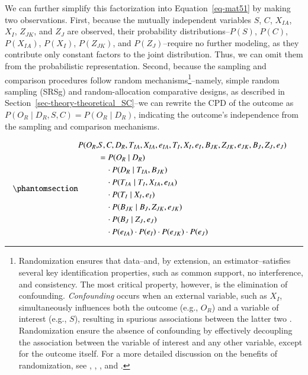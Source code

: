 \documentclass[
  authoryear,
  review,
  1p]{elsarticle}
\begin{document}
We can further simplify this factorization into Equation~\ref{eq-mat51}
by making two observations. First, because the mutually independent
variables \(S\), \(C\), \(X_{IA}\), \(X_{I}\), \(Z_{JK}\), and \(Z_{J}\)
are observed, their probability distributions--\(P(S)\), \(P(C)\),
\(P(X_{IA})\), \(P(X_{I})\), \(P(Z_{JK})\), and \(P(Z_{J})\)--require no
further modeling, as they contribute only constant factors to the joint
distribution. Thus, we can omit them from the probabilistic
representation. Second, because the sampling and comparison procedures
follow random mechanisms\footnote{Randomization ensures that data--and,
  by extension, an estimator--satisfies several key identification
  properties, such as common support, no interference, and consistency.
  The most critical property, however, is the elimination of
  confounding. \emph{Confounding} occurs when an external variable, such
  as \(X_{I}\), simultaneously influences both the outcome (e.g.,
  \(O_{R}\)) and a variable of interest (e.g., \(S\)), resulting in
  spurious associations between the latter two
  \citep{Everitt_et_al_2010}. Randomization ensure the absence of
  confounding by effectively decoupling the association between the
  variable of interest and any other variable, except for the outcome
  itself. For a more detailed discussion on the benefits of
  randomization, see \citet{Pearl_2009}, \citet{Morgan_et_al_2014},
  \citet{Neal_2020}, and \citet{Hernan_et_al_2025}.}--namely, simple
random sampling (SRSg) and random-allocation comparative designs, as
described in Section~\ref{sec-theory-theoretical_SC}--we can rewrite the
CPD of the outcome as
\(P(O_{R} \mid D_{R}, S, C) = P(O_{R} \mid D_{R})\), indicating the
outcome's independence from the sampling and comparison mechanisms.

\begin{equation}\protect\phantomsection\label{eq-mat51}{
\begin{aligned}
  P(O_{R}, & S, C, D_{R}, T_{IA}, X_{IA}, e_{IA}, T_{I}, X_{I}, e_{I}, B_{JK}, Z_{JK}, e_{JK}, B_{J}, Z_{J}, e_{J} ) & \\
  &= P(O_{R} \mid D_{R}) \\
  & \quad \cdot P(D_{R} \mid T_{IA}, B_{JK}) \\
  & \quad \cdot P(T_{IA} \mid T_{I}, X_{IA}, e_{IA}) \\
  & \quad \cdot P(T_{I} \mid X_{I}, e_{I}) \\
  & \quad \cdot P(B_{JK} \mid B_{J}, Z_{JK}, e_{JK}) \\
  & \quad \cdot P(B_{J} \mid Z_{J}, e_{J}) \\
  & \quad \cdot P(e_{IA}) \cdot P(e_{I}) \cdot P(e_{JK}) \cdot P(e_{J})  
\end{aligned}
}\end{equation}
\end{document}

